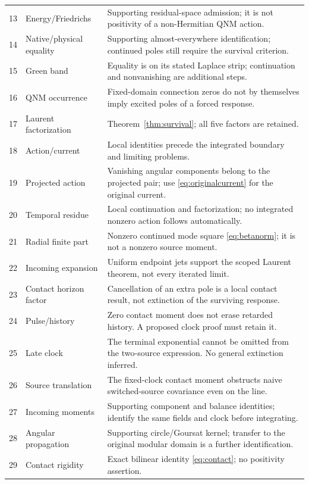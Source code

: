 \begin{longtable}{@{}p{.07\linewidth}p{.28\linewidth}p{.59\linewidth}@{}}
13 & Energy/Friedrichs & Supporting residual-space admission; it is not positivity of a non-Hermitian QNM action.\\
14 & Native/physical equality & Supporting almost-everywhere identification; continued poles still require the survival criterion.\\
15 & Green band & Equality is on its stated Laplace strip; continuation and nonvanishing are additional steps.\\
16 & QNM occurrence & Fixed-domain connection zeros do not by themselves imply excited poles of a forced response.\\
17 & Laurent factorization & Theorem~\ref{thm:survival}; all five factors are retained.\\
18 & Action/current & Local identities precede the integrated boundary and limiting problems.\\
19 & Projected action & Vanishing angular components belong to the projected pair; use \eqref{eq:originalcurrent} for the original current.\\
20 & Temporal residue & Local continuation and factorization; no integrated nonzero action follows automatically.\\
21 & Radial finite part & Nonzero continued mode square \eqref{eq:betanorm}; it is not a nonzero source moment.\\
22 & Incoming expansion & Uniform endpoint jets support the scoped Laurent theorem, not every iterated limit.\\
23 & Contact horizon factor & Cancellation of an extra pole is a local contact result, not extinction of the surviving response.\\
24 & Pulse/history & Zero contact moment does not erase retarded history. A proposed clock proof must retain it.\\
25 & Late clock & The terminal exponential cannot be omitted from the two-source expression. No general extinction inferred.\\
26 & Source translation & The fixed-clock contact moment obstructs naive switched-source covariance even on the line.\\
27 & Incoming moments & Supporting component and balance identities; identify the same fields and clock before integrating.\\
28 & Angular propagation & Supporting circle/Goursat kernel; transfer to the original modular domain is a further identification.\\
29 & Contact rigidity & Exact bilinear identity \eqref{eq:contact}; no positivity assertion.\\

\end{longtable}
